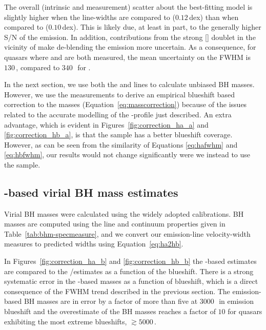 The overall (intrinsic and measurement) scatter about the best-fitting model is slightly higher when the  line-widths are compared to \hb ($0.12$\,dex) than when compared to \ha ($0.10$\,dex). 
This is likely due, at least in part, to the generally higher S/N of the \ha emission. 
In addition, contributions from the strong [] doublet in the vicinity of \hb make de-blending the \hb emission more uncertain. 
As a consequence, for quasars where \ha and \hb are both measured, the mean uncertainty on the \ha FWHM is $130$\,\kms, compared to $340$\,\kms\, for \hbns. 

In the next section, we use both the \ha and \hb lines to calculate unbiased BH masses. 
However, we use the \ha measurements to derive an empirical  blueshift based correction to the  masses (Equation~\ref{eq:masscorrection}) because of the issues related to the accurate modelling of the \hbns-profile just described.  
An extra advantage, which is evident in Figures~\ref{fig:correction_ha_a} and \ref{fig:correction_hb_a}, is that the \ha sample has a better  blueshift coverage. 
However, as can be seen from the similarity of Equations \ref{eq:hafwhm} and \ref{eq:hbfwhm}, our results would not change significantly were we instead to use the \hb sample. 

\subsection{-based virial BH mass estimates}

Virial BH masses were calculated using the widely adopted \citet{vestergaard06} calibrations. 
BH masses are computed using the line and continuum properties given in Table~\ref{tab:bhm-specmeasure}, and we convert our \ha emission-line velocity-width measures to predicted \hb widths using Equation~\ref{eq:ha2hb}.

In Figures~\ref{fig:correction_ha_b} and \ref{fig:correction_hb_b} the -based estimates are compared to the \hans/\hb estimates as a function of the  blueshift. 
There is a strong systematic error in the -based masses as a function of blueshift, which is a direct consequence of the FWHM trend described in the previous section. 
The  emission-based BH masses are in error by a factor of more than five at $3000$\,\kms\, in  emission blueshift and the overestimate of the BH masses reaches a factor of $10$ for quasars exhibiting the most extreme blueshifts, $\gtrsim5000$\,\kms. 

